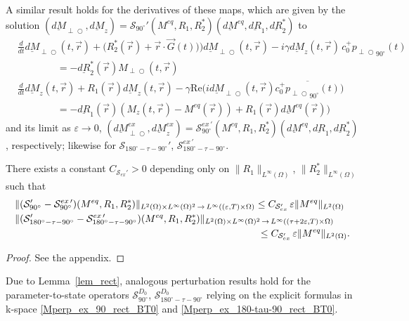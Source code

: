\documentclass{ws-m3as}
\newcommand{\uld}[1]{\underline{d#1}}
\renewcommand\Re{\mathrm{Re}}
\def\Mpp{M_{\perp\!\!\!\!\!\bigcirc}}
\def\pp{p_{\perp\!\!\!\!\!\bigcirc}}
\def\uldMpp{\uld{M}_{\perp\!\!\!\!\!\bigcirc}}
\newcommand\taup{\varepsilon}
\newcommand{\Margin}[1]{}
\begin{document}
A similar result holds for the derivatives of these maps, which are given by the solution 
$(\uldMpp,\uld{M}_z)=\mathcal{S}_{90^\circ}'(M^{eq},R_1,R_2^*)(\uld{M}^{eq},\uld{R}_1,\uld{R}_2^*)$ to 
\begin{equation}\label{Sprime90deg}
\begin{aligned}
&\frac{d}{dt}\uldMpp(t, \vec r) +\bigl(R_2^*(\vec r) + \vec r \cdot \vec G(t))\bigr)\uldMpp(t, \vec r)-i\gamma  \uld{M}_z(t, \vec r) \, c_0^+{\pp}_{90^\circ}(t)\\
&\qquad\qquad=-\uld{R}_2^*(\vec r)\Mpp(t, \vec r)
\\    
&\frac{d}{dt}\uld{M}_z(t, \vec r) +R_1(\vec r) \uld{M}_z(t, \vec r)-\gamma\Re\bigl(i \uldMpp(t, \vec r)\overline{c_0^+{\pp}_{90^\circ}(t)}\bigr)\\
&\qquad\qquad=-\uld{R}_1(\vec r) (M_z(t, \vec r)-M^{eq}(\vec r))+R_1(\vec r)\uld{M}^{eq}(\vec r))
\end{aligned}
\end{equation}
and its limit as $\taup\to0$, 
$(\uldMpp^{ex},\uld{M}_z^{ex})={\mathcal{S}_{90^\circ}^{ex\,\prime}}(M^{eq},R_1,R_2^*)(\uld{M}^{eq},\uld{R}_1,\uld{R}_2^*)$, respectively; 
likewise for $\mathcal{S}_{180^\circ-\tau-90^\circ}'$, ${\mathcal{S}_{180^\circ-\tau-90^\circ}^{ex\,\prime}}$. 
%
\begin{proposition}\label{prop:perturb_expl-sol_lin}
There exists a constant $C_{\mathcal{S}_{ex}'}>0$ depending only on $\|R_1\|_{L^\infty(\Omega)}$, $\|R_2^*\|_{L^\infty(\Omega)}$ such that
\[
\begin{aligned}
&\|(\mathcal{S}_{90^\circ}'-{\mathcal{S}_{90^\circ}^{ex\,\prime}})(M^{eq},R_1,R_2^*)\|_{
L^2(\Omega)\times L^\infty(\Omega)^2\,\to\,L^\infty((\taup,T)\times\Omega)}\leq C_{\mathcal{S}_{ex}'}\,\taup\|M^{eq}\|_{L^2(\Omega)}
\\
&\|(\mathcal{S}_{180^\circ-\tau-90^\circ}'-{\mathcal{S}_{180^\circ-\tau-90^\circ}^{ex\,\prime}})(M^{eq},R_1,R_2^*)\|_{L^2(\Omega)\times L^\infty(\Omega)^2\,\to\,L^\infty((\tau+2\taup,T)\times\Omega)}
\\&\hspace*{8.7cm}
\leq C_{\mathcal{S}_{ex}'}\,\taup\|M^{eq}\|_{L^2(\Omega)}.
\end{aligned}
\]
\end{proposition}
\begin{proof}
See the appendix. 
\Margin{R1 C.}
\Margin{R2 (3)}
\end{proof}

\begin{remark}\label{rem:perturb_kspace} 	%
Due to Lemma~\ref{lem_rect}, analogous perturbation results hold for the parameter-to-state operators $\mathcal{S}^{D_0}_{90^\circ}$, $\mathcal{S}^{D_0}_{180^\circ-\tau-90^\circ}$ relying on the explicit formulas in k-space \eqref{Mperp_ex_90_rect_BT0} and \eqref{Mperp_ex_180-tau-90_rect_BT0}.
\end{remark} 
\end{document}
